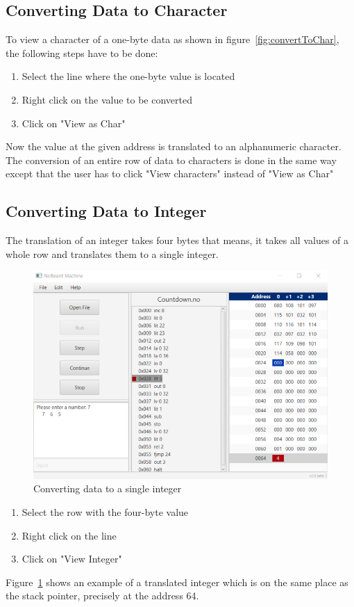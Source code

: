\subsection{Converting Data to Character}
To view a character of a one-byte data as shown in figure~\ref{fig:convertToChar}, the following steps have to be done:
\begin{enumerate}
\item Select the line where the one-byte value is located 
\item Right click on the value to be converted
\item Click on "View as Char" 
\end{enumerate}
Now the value at the given address is translated to an alphanumeric character. 
The conversion of an entire row of data to characters is done in the same way except that the user has to click "View characters" instead of "View as Char"
\subsection{Converting Data to Integer}
The translation of an integer takes four bytes that means, it takes all values of a whole row and translates them to a single integer.  
\begin{figure}[h] 
	\centering
	\includegraphics[scale=.90]{images/screenshot-4.png}
	\caption{Converting data to a single integer}
	\label{fig:convertToInt}
\end{figure}
\begin{enumerate}
\item Select the row with the four-byte value 
\item Right click on the line
\item Click on "View Integer"
\end{enumerate}
Figure~\ref{fig:convertToInt} shows an example of a translated integer which is on the same place as the stack pointer, precisely at the address 64. 

